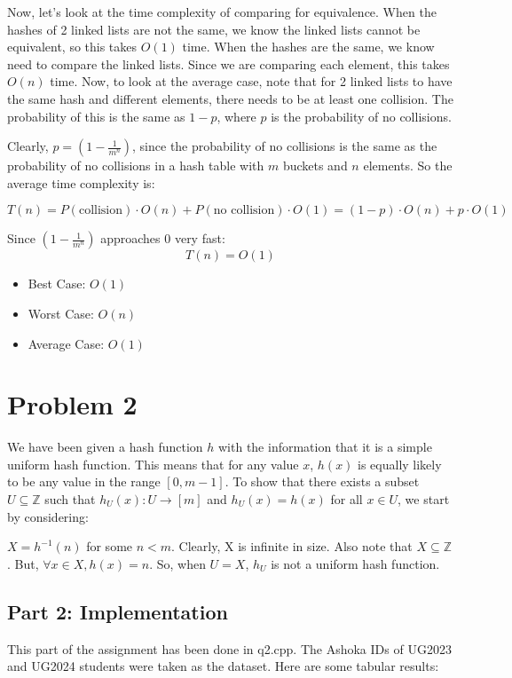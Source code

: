 \documentclass{cs1204}
\begin{document}
Now, let's look at the time complexity of comparing for equivalence. When the hashes of 2 linked lists are not the same, we know the linked lists cannot be equivalent, so this takes $O(1)$ time. When the hashes are the same, we know need to compare the linked lists. Since we are comparing each element, this takes $O(n)$ time. Now, to look at the average case, note that for 2 linked lists to have the same hash and different elements, there needs to be at least one collision. The probability of this is the same as $1 - p$, where $p$ is the probability of no collisions. 

Clearly, $p = \left(1 - \frac{1}{m^n}\right)$, since the probability of no collisions is the same as the probability of no collisions in a hash table with $m$ buckets and $n$ elements. So the average time complexity is:

\[T(n) = P(\text{collision}) \cdot O(n) + P(\text{no collision}) \cdot O(1) = (1 - p) \cdot O(n) + p \cdot O(1)\]

Since $(1 - \frac{1}{m^n})$ approaches $0$ very fast:
\[ T(n) = O(1) \]

\begin{itemize}
    \item Best Case: $O(1)$
    \item Worst Case: $O(n)$
    \item Average Case: $O(1)$
\end{itemize}


\newpage
\section*{Problem 2}

We have been given a hash function $h$ with the information that it is a simple uniform hash function. This means that for any value $x$, $h(x)$ is equally likely to be any value in the range $[0, m-1]$. To show that there exists a subset $U \subseteq \mathbb{Z}$ such that $h_U(x) : U \rightarrow [m]$ and $h_U(x) = h(x)$ for all $x \in U$, we start by considering:

$X = h^{-1}(n)$ for some $n < m$. Clearly, X is infinite in size. Also note that $X \subseteq \mathbb{Z}$. But, $\forall x \in X, h(x) = n$. So, when $U = X$, $h_U$ is not a uniform hash function.


\subsection*{Part 2: Implementation}
This part of the assignment has been done in q2.cpp. The Ashoka IDs of UG2023 and UG2024 students were taken as the dataset. Here are some tabular results:
\end{document}
